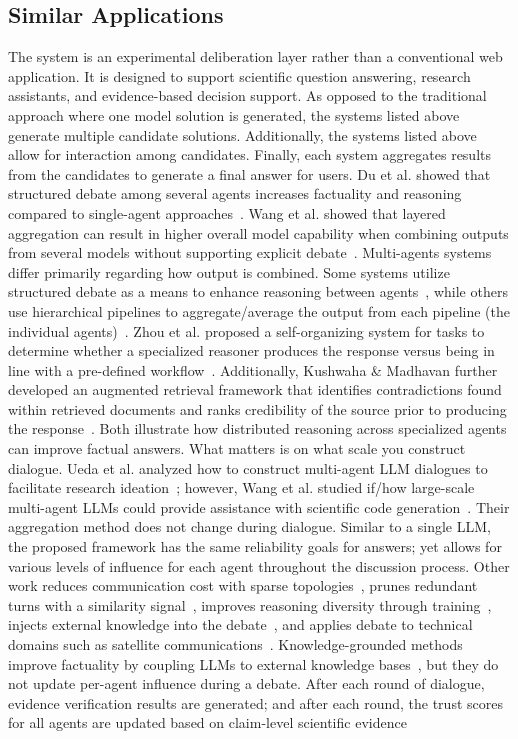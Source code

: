 \subsection{Similar Applications}\label{subsec:similar-applications}
The system is an experimental deliberation layer rather than a conventional web application. It is designed to support scientific question answering, research assistants, and evidence-based decision support. As opposed to the traditional approach where one model solution is generated, the systems listed above generate multiple candidate solutions. Additionally, the systems listed above allow for interaction among candidates. Finally, each system aggregates results from the candidates to generate a final answer for users. Du et al. showed that structured debate among several agents increases factuality and reasoning compared to single-agent approaches~\cite{du2024improving}. Wang et al. showed that layered aggregation can result in higher overall model capability when combining outputs from several models without supporting explicit debate~\cite{wang2025mixture}. Multi-agents systems differ primarily regarding how output is combined. Some systems utilize structured debate as a means to enhance reasoning between agents~\cite{du2024improving}, while others use hierarchical pipelines to aggregate/average the output from each pipeline (the individual agents)~\cite{wang2025mixture}. Zhou et al. proposed a self-organizing system for tasks to determine whether a specialized reasoner produces the response versus being in line with a pre-defined workflow~\cite{zhou2025reso}. Additionally, Kushwaha \& Madhavan further developed an augmented retrieval framework that identifies contradictions found within retrieved documents and ranks credibility of the source prior to producing the response~\cite{kushwaha2026agentbased}. Both illustrate how distributed reasoning across specialized agents can improve factual answers. What matters is on what scale you construct dialogue. Ueda et al. analyzed how to construct multi-agent LLM dialogues to facilitate research ideation~\cite{ueda2025exploring}; however, Wang et al. studied if/how large-scale multi-agent LLMs could provide assistance with scientific code generation~\cite{wang2025scalability}. Their aggregation method does not change during dialogue. Similar to a single LLM, the proposed framework has the same reliability goals for answers; yet allows for various levels of influence for each agent throughout the discussion process. Other work reduces communication cost with sparse topologies~\cite{li-etal-2024-improving-multi}, prunes redundant turns with a similarity signal~\cite{zeng2025s2mad}, improves reasoning diversity through training~\cite{subramaniam2025multiagent}, injects external knowledge into the debate~\cite{wang2025learning}, and applies debate to technical domains such as satellite communications~\cite{gomez2026multiagent}. Knowledge-grounded methods improve factuality by coupling LLMs to external knowledge bases~\cite{yang2025comprehensive}, but they do not update per-agent influence during a debate. After each round of dialogue, evidence verification results are generated; and after each round, the trust scores for all agents are updated based on claim-level scientific evidence 